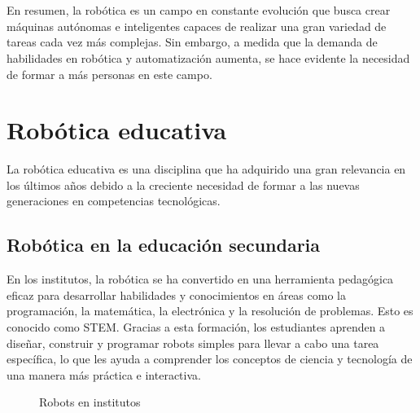\section*{}
En resumen, la robótica es un campo en constante evolución que busca crear máquinas autónomas e inteligentes capaces de realizar una gran variedad de tareas cada vez 
más complejas. Sin embargo, a medida que la demanda de habilidades en robótica y automatización aumenta, se hace evidente la necesidad de formar a más personas en este campo.

\newpage
\section{Robótica educativa}
\label{sec:rob_educativa}
\noindent La robótica educativa es una disciplina que ha adquirido una gran relevancia en los últimos años debido a la creciente necesidad de formar a las nuevas generaciones en
competencias tecnológicas.
\subsection{Robótica en la educación secundaria}
\noindent En los institutos, la robótica se ha convertido en una herramienta pedagógica eficaz para desarrollar habilidades y conocimientos en áreas como la programación, 
la matemática, la electrónica y la resolución de problemas. Esto es conocido como \ac{STEM}. Gracias a esta formación, los 
estudiantes aprenden a diseñar, construir y programar robots simples para llevar a cabo una tarea específica, lo que les ayuda a comprender  
los conceptos de ciencia y tecnología de una manera más práctica e interactiva.\\
\begin{figure} [ht!]
  \centering    
  \hspace{1cm}
  \caption{Robots en institutos}
\end{figure}

